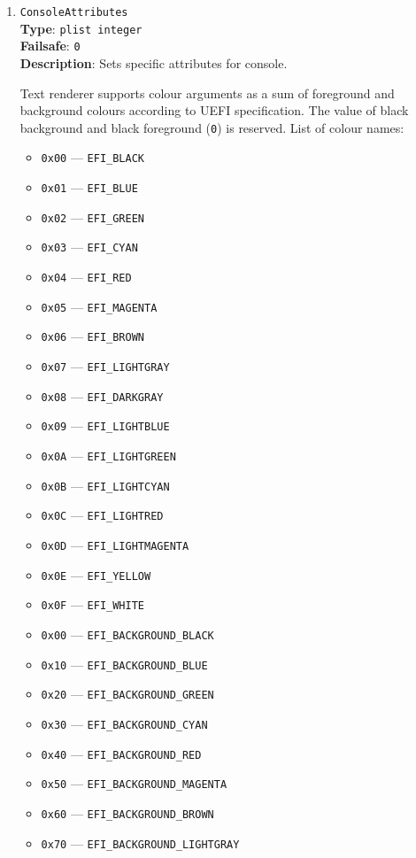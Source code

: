 \documentclass[]{article}
\providecommand{\tightlist}{%
  \setlength{\itemsep}{0pt}\setlength{\parskip}{0pt}}
\begin{document}
\begin{enumerate}

\item
  \texttt{ConsoleAttributes}\\
  \textbf{Type}: \texttt{plist\ integer}\\
  \textbf{Failsafe}: \texttt{0}\\
  \textbf{Description}: Sets specific attributes for console.

  Text renderer supports colour arguments as a sum of foreground and background
  colours according to UEFI specification. The value of black background and
  black foreground (\texttt{0}) is reserved. List of colour names:

  \begin{itemize}
  \tightlist
  \item \texttt{0x00} --- \texttt{EFI\_BLACK}
  \item \texttt{0x01} --- \texttt{EFI\_BLUE}
  \item \texttt{0x02} --- \texttt{EFI\_GREEN}
  \item \texttt{0x03} --- \texttt{EFI\_CYAN}
  \item \texttt{0x04} --- \texttt{EFI\_RED}
  \item \texttt{0x05} --- \texttt{EFI\_MAGENTA}
  \item \texttt{0x06} --- \texttt{EFI\_BROWN}
  \item \texttt{0x07} --- \texttt{EFI\_LIGHTGRAY}
  \item \texttt{0x08} --- \texttt{EFI\_DARKGRAY}
  \item \texttt{0x09} --- \texttt{EFI\_LIGHTBLUE}
  \item \texttt{0x0A} --- \texttt{EFI\_LIGHTGREEN}
  \item \texttt{0x0B} --- \texttt{EFI\_LIGHTCYAN}
  \item \texttt{0x0C} --- \texttt{EFI\_LIGHTRED}
  \item \texttt{0x0D} --- \texttt{EFI\_LIGHTMAGENTA}
  \item \texttt{0x0E} --- \texttt{EFI\_YELLOW}
  \item \texttt{0x0F} --- \texttt{EFI\_WHITE}
  \item \texttt{0x00} --- \texttt{EFI\_BACKGROUND\_BLACK}
  \item \texttt{0x10} --- \texttt{EFI\_BACKGROUND\_BLUE}
  \item \texttt{0x20} --- \texttt{EFI\_BACKGROUND\_GREEN}
  \item \texttt{0x30} --- \texttt{EFI\_BACKGROUND\_CYAN}
  \item \texttt{0x40} --- \texttt{EFI\_BACKGROUND\_RED}
  \item \texttt{0x50} --- \texttt{EFI\_BACKGROUND\_MAGENTA}
  \item \texttt{0x60} --- \texttt{EFI\_BACKGROUND\_BROWN}
  \item \texttt{0x70} --- \texttt{EFI\_BACKGROUND\_LIGHTGRAY}
  \end{itemize}


\end{enumerate}
\end{document}
